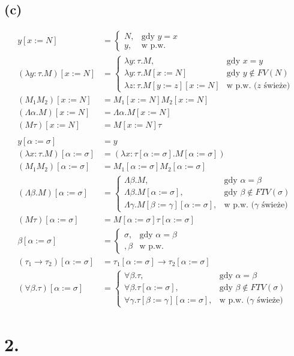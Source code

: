 \documentclass[a4paper, 12pt]{article}
\newcommand{\+}{\enspace}
\begin{document}
\subsection*{(c)}

\begin{align*}
	y[x:=N] &= \begin{cases} N, &\text{gdy }y = x \\ y, &\text{w p.w.} \end{cases} \\
	(λy:τ.M)[x:=N] &= \begin{cases}
		λy:τ.M, &\text{gdy }x=y \\
		λy:τ.M[x:=N] &\text{gdy }y\not\in FV(N) \\
		λz:τ.M[y:=z][x:=N] &\text{w p.w. ($z$ świeże)}
	\end{cases} \\
	(M_1 M_2)[x:=N] &= M_1[x:=N] M_2[x:=N] \\
	(Λα.M)[x:=N] &= Λα.M[x:=N] \\
	(Mτ)[x:=N] &= M[x:=N]τ \\ %
	\\
	y[α:=σ] &= y \\
	(λx:τ.M)[α:=σ] &= (λx:τ[α:=σ].M[α:=σ]) \\
	(M_1 M_2)[α:=σ] &= M_1[α:=σ] M_2[α:=σ] \\
	(Λβ.M)[α:=σ] &= \begin{cases}
		Λβ.M, &\text{gdy }α=β \\
		Λβ.M[α:=σ], &\text{gdy }β\not\in FTV(σ) \\
		Λγ.M[β:=γ][α:=σ], &\text{w p.w. ($γ$ świeże)}
	\end{cases} \\
	(Mτ)[α:=σ] &= M[α:=σ]τ[α:=σ] \\
	β[α:=σ] &= \begin{cases} σ, &\text{gdy }α=β \\,  β &\text{w p.w.} \end{cases} \\
	(τ_1→τ_2)[α:=σ] &= τ_1[α:=σ] → τ_2[α:=σ] \\
	(∀β. τ)[α:=σ] &= \begin{cases}
		∀β. τ, &\text{gdy }α=β \\
		∀β. τ[α:=σ], &\text{gdy }β\not\in FTV(σ) \\
		∀γ. τ[β:=γ][α:=σ], &\text{w p.w. ($γ$ świeże)}
	\end{cases}
\end{align*}

\section*{2.}
\end{document}
